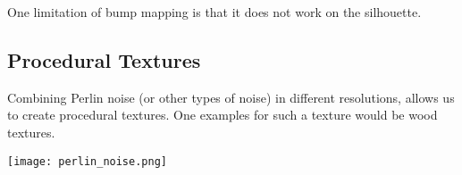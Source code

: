 One limitation of bump mapping is that it does not work on the silhouette.


\subsection{Procedural Textures}

Combining Perlin noise (or other types of noise) in different resolutions, allows us to create procedural textures. One examples for such a texture would be wood textures.

\begin{center}
	\texttt{[image: perlin\_noise.png]}
\end{center}
